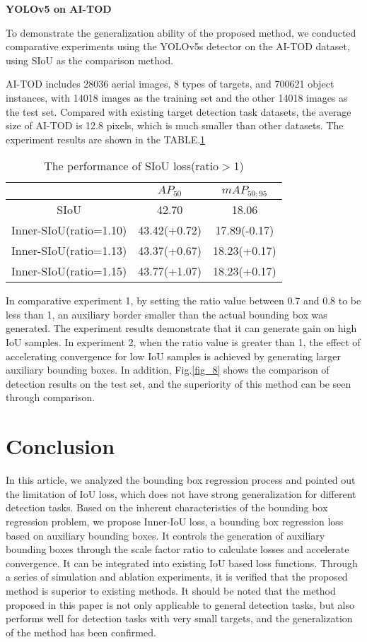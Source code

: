 \documentclass[lettersize,journal]{IEEEtran}
\begin{document}
	\newline
	\newline
	\textbf {YOLOv5 on AI-TOD}
	\par To demonstrate the generalization ability of the proposed method, we conducted comparative experiments using the YOLOv5s detector on the AI-TOD dataset\cite{ref21}, using SIoU\cite{ref5} as the comparison method.
	
	AI-TOD includes 28036 aerial images, 8 types of targets, and 700621 object instances, with 14018 images as the training set and the other 14018 images as the test set. Compared with existing target detection task datasets, the average size of AI-TOD is 12.8 pixels, which is much smaller than other datasets. The experiment results are shown in the TABLE.\ref{tab:mytable2}
	\begin{table}[h]
		\centering
		\begin{tabular}{ccc}
			\toprule & $AP_{50}$ & $mAP_{50:95}$ \\
			\midrule SIoU & 42.70 & 18.06 \\
			Inner-SIoU(ratio=1.10) & 43.42(+0.72) & 17.89(-0.17) \\
			Inner-SIoU(ratio=1.13) & 43.37(+0.67) & 18.23(+0.17) \\
			Inner-SIoU(ratio=1.15) & 43.77(+1.07) & 18.23(+0.17) \\
			\bottomrule \end{tabular}
		\caption{The performance of SIoU loss(ratio$>$1)}
		\label{tab:mytable2}
	\end{table}
	\par In comparative experiment 1, by setting the ratio value between 0.7 and 0.8 to be less than 1, an auxiliary border smaller than the actual bounding box was generated. The experiment results demonstrate that it can generate gain on high IoU samples. In experiment 2, when the ratio value is greater than 1, the effect of accelerating convergence for low IoU samples is achieved by generating larger auxiliary bounding boxes. In addition, Fig.\ref{fig_8} shows the comparison of detection results on the test set, and the superiority of this method can be seen through comparison.
	\section{Conclusion}
	\par In this article, we analyzed the bounding box regression process and pointed out the limitation of IoU loss, which does not have strong generalization for different detection tasks. Based on the inherent characteristics of the bounding box regression problem, we propose Inner-IoU loss, a bounding box regression loss based on auxiliary bounding boxes. It controls the generation of auxiliary bounding boxes through the scale factor ratio to calculate losses and accelerate convergence. It can be integrated into existing IoU based loss functions.
	Through a series of simulation and ablation experiments, it is verified that the proposed method is superior to existing methods. It should be noted that the method proposed in this paper is not only applicable to general detection tasks, but also performs well for detection tasks with very small targets, and the generalization of the method has been confirmed.
\end{document}
